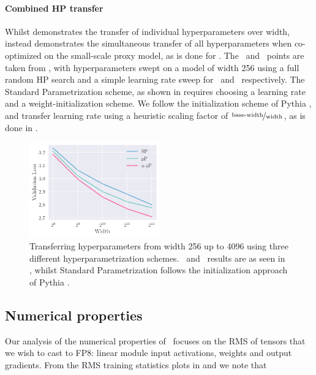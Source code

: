 \paragraph{Combined HP transfer}
Whilst  demonstrates the transfer of individual hyperparameters over width,  instead demonstrates the simultaneous transfer of all hyperparameters when co-optimized on the small-scale proxy model, as is done for \mut. The \mup\ and \umup\ points are taken from , with hyperparameters swept on a model of width 256 using a full random HP search and a simple learning rate sweep for \mup\ and \umup\ respectively. The Standard Parametrization scheme, as shown in  requires choosing a learning rate and a weight-initialization scheme. We follow the initialization scheme of Pythia \citep{Pythia}, and transfer learning rate using a heuristic scaling factor of $\nicefrac{\mathrm{base{\text -}width}}{\mathrm{width}}$, as is done in \citep{LLAMA3}.

\begin{figure}[h]
    \centering
    \includegraphics[width=0.5\textwidth]{arXiv/figures/fig_sp_transfer.pdf}
    \caption{Transferring hyperparameters from width 256 up to 4096 using three different hyperparametrization schemes. \mup\ and \umup\ results are as seen in , whilst Standard Parametrization follows the initialization approach of Pythia \citep{Pythia}.}
    \label{fig:experiments:SP}
\end{figure}

\FloatBarrier
\clearpage

\subsection{Numerical properties} \label{app:fp8_training}

Our analysis of the numerical properties of \umup\ focuses on the RMS of tensors that we wish to cast to FP8: linear module input activations, weights and output gradients.
From the RMS training statistics plots in  and  we note that


